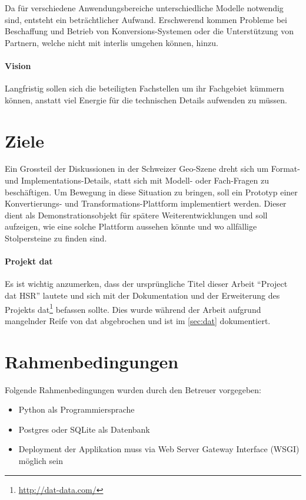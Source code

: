 Da für verschiedene Anwendungsbereiche unterschiedliche Modelle notwendig sind, entsteht ein beträchtlicher Aufwand. Erschwerend kommen Probleme bei Beschaffung und Betrieb von Konversions-Systemen oder die Unterstützung von Partnern, welche nicht mit \gls{interlis} umgehen können, hinzu.

\paragraph{Vision}
Langfristig sollen sich die beteiligten Fachstellen um ihr Fachgebiet kümmern können, anstatt viel Energie für die technischen Details aufwenden zu müssen. 

\section{Ziele}
Ein Grossteil der Diskussionen in der Schweizer Geo-Szene dreht sich um Format- und Implementations-Details, statt sich mit Modell- oder Fach-Fragen zu beschäftigen\cite{sfkeller}. Um Bewegung in diese Situation zu bringen, soll ein Prototyp einer Konvertierungs- und Transformations-Plattform implementiert werden. Dieser dient als Demonstrationsobjekt für spätere Weiterentwicklungen und soll aufzeigen, wie eine solche Plattform aussehen könnte und wo allfällige Stolpersteine zu finden sind.

\paragraph{Projekt dat}
Es ist wichtig anzumerken, dass der ursprüngliche Titel dieser Arbeit ``Project dat HSR'' lautete und sich mit der Dokumentation und der Erweiterung des Projekts dat\footnote{\url{http://dat-data.com/}} befassen sollte. Dies wurde während der Arbeit aufgrund mangelnder Reife von \gls{dat} abgebrochen und ist im \vref{sec:dat} dokumentiert.

\section{Rahmenbedingungen}

Folgende Rahmenbedingungen wurden durch den Betreuer\cite{sfkeller} vorgegeben:

\begin{itemize}
\item Python als Programmiersprache
\item Postgres oder SQLite als Datenbank
\item Deployment der Applikation muss via Web Server Gateway Interface (WSGI) möglich sein
\end{itemize}

